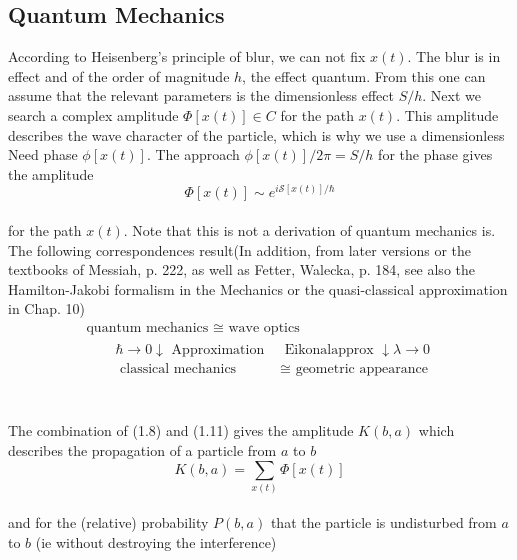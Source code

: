 \subsection{Quantum Mechanics}
According to Heisenberg's principle of blur, we can not fix $x (t)$. The blur is in effect and of the order of magnitude $h$, the effect quantum. From this one can assume that the relevant parameters is the dimensionless effect $S / h$. Next we search
a complex amplitude $\Phi[x (t)] \in C$ for the path $x (t)$. This amplitude describes the wave character of the particle, which is why we use a dimensionless
Need phase $\phi[x (t)]$. The approach $\phi[x (t)]/2\pi = S/h$ for the phase gives the amplitude
\\
\begin{equation}
\Phi[x(t)] \sim e^{i \mathcal{S}[x(t)] / \hbar}
\end{equation}\\
for the path $x (t)$. Note that this is not a derivation of quantum mechanics
is. The following correspondences result(In addition, from later versions or the textbooks of Messiah,
p. 222, as well as Fetter, Walecka, p. 184, see also the Hamilton-Jakobi formalism in the
Mechanics or the quasi-classical approximation in Chap. 10)
\\
\begin{equation}
\begin{array}{c}{\text { quantum mechanics } \cong \text { wave optics }} \\ 
{\qquad \begin{aligned} 
\hbar\to 0 \downarrow \text { Approximation } & \text { Eikonalapprox } \downarrow \lambda \rightarrow 0 \\ \text { classical mechanics } & \cong \text { geometric appearance } \end{aligned}}\end{array}
\end{equation}\\
\\
The combination of (1.8) and (1.11) gives the amplitude $K (b, a)$
which describes the propagation of a particle from $a$ to $b$
\\\begin{equation}
K(b, a)=\sum_{x(t)} \Phi[x(t)]
\end{equation}\\
and for the (relative) probability $P (b, a)$ that the particle is undisturbed
from $a$ to $b$ (ie without destroying the interference)\\
